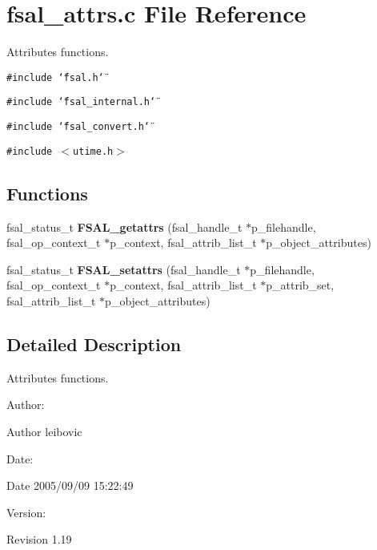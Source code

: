 \section{fsal\_\-attrs.c File Reference}
\label{fsal__attrs_8c}
Attributes functions.  


{\tt \#include \char`\"{}fsal.h\char`\"{}}\par
{\tt \#include \char`\"{}fsal\_\-internal.h\char`\"{}}\par
{\tt \#include \char`\"{}fsal\_\-convert.h\char`\"{}}\par
{\tt \#include $<$utime.h$>$}\par
\subsection*{Functions}
\begin{CompactItemize}
\item 
fsal\_\-status\_\-t {\bf FSAL\_\-getattrs} (fsal\_\-handle\_\-t $\ast$p\_\-filehandle, fsal\_\-op\_\-context\_\-t $\ast$p\_\-context, fsal\_\-attrib\_\-list\_\-t $\ast$p\_\-object\_\-attributes)
\item 
fsal\_\-status\_\-t {\bf FSAL\_\-setattrs} (fsal\_\-handle\_\-t $\ast$p\_\-filehandle, fsal\_\-op\_\-context\_\-t $\ast$p\_\-context, fsal\_\-attrib\_\-list\_\-t $\ast$p\_\-attrib\_\-set, fsal\_\-attrib\_\-list\_\-t $\ast$p\_\-object\_\-attributes)
\end{CompactItemize}


\subsection{Detailed Description}
Attributes functions. 

\begin{Desc}
\item[Author:]\end{Desc}
\begin{Desc}
\item[Author]leibovic \end{Desc}
\begin{Desc}
\item[Date:]\end{Desc}
\begin{Desc}
\item[Date]2005/09/09 15:22:49 \end{Desc}
\begin{Desc}
\item[Version:]\end{Desc}
\begin{Desc}
\item[Revision]1.19 \end{Desc}


